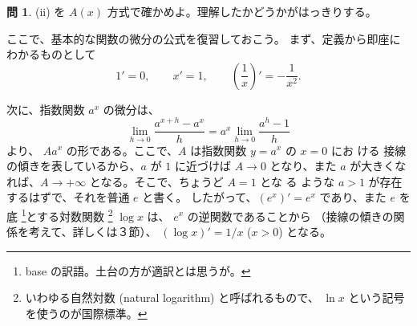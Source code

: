 \documentclass[a4paper]{jsarticle}
\theoremstyle{definition}
\newtheorem{Exercise}{問}%
\theoremstyle{remark}
\begin{document}
\begin{Exercise}
  (ii) を $A(x)$ 方式で確かめよ。理解したかどうかがはっきりする。
\end{Exercise}

ここで、基本的な関数の微分の公式を復習しておこう。
まず、定義から即座にわかるものとして
\[
1' = 0,\qquad x' = 1,\qquad 
\left(
\frac{1}{x} 
\right)' = -\frac{1}{x^2}. 
\]

次に、指数関数 $a^x$ の微分は、
\[
\lim_{h\to 0} \frac{a^{x+h}-a^x}{h}
= a^x \lim_{h\to 0} \frac{a^h - 1}{h}
\]
より、 $Aa^x$ の形である。ここで、$A$ は指数関数 $y = a^x$ の $x=0$ にお
ける
接線の傾きを表しているから、$a$ が $1$ に近づけば $A \to 0$ となり、また
$a$ が大きくなれば、$A \to +\infty$ となる。そこで、ちょうど $A=1$ とな
る
ような $a>1$ が存在するはずで、それを普通 $e$ と書く。
したがって、$(e^x)' = e^x$ であり、また $e$ を底
\footnote{base の訳語。土台の方が適訳とは思うが。}とする対数関数
\footnote{いわゆる自然対数 (natural logarithm) と呼ばれるもので、
$\ln x$ という記号を使うのが国際標準。} $\log x$
 は、
$e^x$ の逆関数であることから
（接線の傾きの関係を考えて、詳しくは３節）、
$(\log x)' = 1/x$ ($x>0$) となる。
\end{document}
